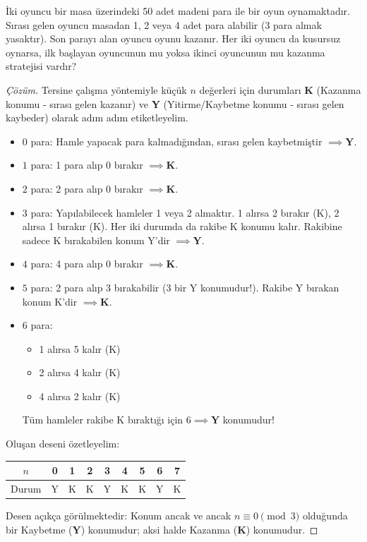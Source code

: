 \begin{example}
İki oyuncu bir masa üzerindeki 50 adet madeni para ile bir oyun oynamaktadır. Sırası gelen oyuncu masadan 1, 2 veya 4 adet para alabilir (3 para almak yasaktır). Son parayı alan oyuncu oyunu kazanır. Her iki oyuncu da kusursuz oynarsa, ilk başlayan oyuncunun mu yoksa ikinci oyuncunun mu kazanma stratejisi vardır?
\end{example}

\begin{proof}[Çözüm]
Tersine çalışma yöntemiyle küçük $n$ değerleri için durumları \textbf{K} (Kazanma konumu - sırası gelen kazanır) ve \textbf{Y} (Yitirme/Kaybetme konumu - sırası gelen kaybeder) olarak adım adım etiketleyelim.
\begin{itemize}
    \item $0$ para: Hamle yapacak para kalmadığından, sırası gelen kaybetmiştir $\implies \mathbf{Y}$.
    \item $1$ para: 1 para alıp 0 bırakır $\implies \mathbf{K}$.
    \item $2$ para: 2 para alıp 0 bırakır $\implies \mathbf{K}$.
    \item $3$ para: Yapılabilecek hamleler 1 veya 2 almaktır. 1 alırsa 2 bırakır (K), 2 alırsa 1 bırakır (K). Her iki durumda da rakibe K konumu kalır. Rakibine sadece K bırakabilen konum Y'dir $\implies \mathbf{Y}$.
    \item $4$ para: 4 para alıp 0 bırakır $\implies \mathbf{K}$.
    \item $5$ para: 2 para alıp 3 bırakabilir (3 bir Y konumudur!). Rakibe Y bırakan konum K'dir $\implies \mathbf{K}$.
    \item $6$ para: 
    \begin{itemize}
        \item 1 alırsa 5 kalır (K)
        \item 2 alırsa 4 kalır (K)
        \item 4 alırsa 2 kalır (K)
    \end{itemize}
    Tüm hamleler rakibe K bıraktığı için $6 \implies \mathbf{Y}$ konumudur!
\end{itemize}

Oluşan deseni özetleyelim:
\begin{center}
\begin{tabular}{|c|c|c|c|c|c|c|c|c|}
\hline
$n$ & 0 & 1 & 2 & 3 & 4 & 5 & 6 & 7 \\
\hline
Durum & Y & K & K & Y & K & K & Y & K \\
\hline
\end{tabular}
\end{center}
Desen açıkça görülmektedir: Konum ancak ve ancak $n \equiv 0 \pmod 3$ olduğunda bir Kaybetme ($\mathbf{Y}$) konumudur; aksi halde Kazanma ($\mathbf{K}$) konumudur.


\end{proof}
